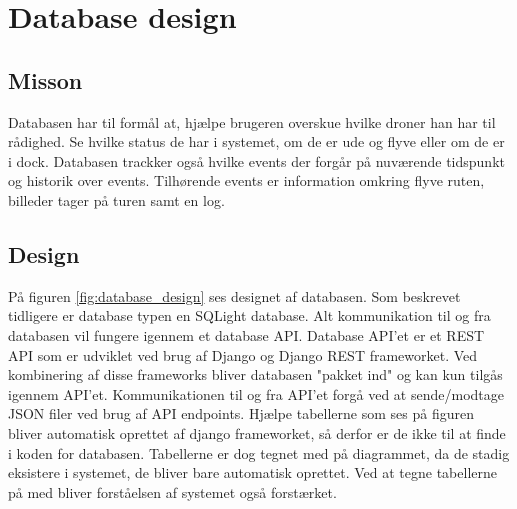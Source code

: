 \section{Database design}

\subsection{Misson}
Databasen har til formål at, hjælpe brugeren overskue hvilke droner han har til rådighed. Se hvilke status de har i systemet, om de er ude og flyve eller om de er i dock. Databasen trackker også hvilke events der forgår på nuværende tidspunkt og historik over events. Tilhørende events er information omkring flyve ruten, billeder tager på turen samt en log.

\subsection{Design}
På figuren \ref{fig:database_design} ses designet af databasen. Som beskrevet tidligere er database typen en SQLight database. Alt kommunikation til og fra databasen vil fungere igennem et database API. Database API'et er et REST API som er udviklet ved brug af Django og Django REST frameworket. Ved kombinering af disse frameworks bliver databasen "pakket ind" og kan kun tilgås igennem API'et. Kommunikationen til og fra API'et forgå ved at sende/modtage JSON filer ved brug af API endpoints. Hjælpe tabellerne som ses på figuren bliver automatisk oprettet af django frameworket, så derfor er de ikke til at finde i koden for databasen. Tabellerne er dog tegnet med på diagrammet, da de stadig eksistere i systemet, de bliver bare automatisk oprettet. Ved at tegne tabellerne på med bliver forståelsen af systemet også forstærket. 

